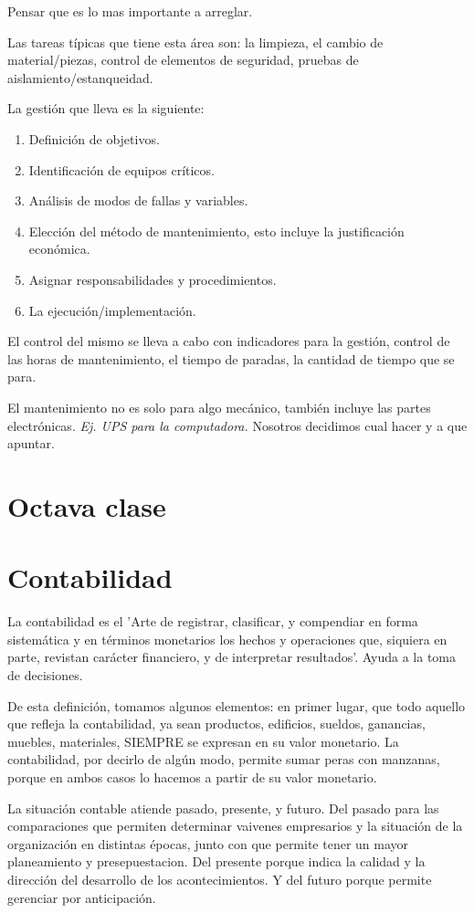 \documentclass[titlepage,a4paper]{article}
\begin{document}
Pensar que es lo mas importante a arreglar.

Las tareas típicas que tiene esta área son: la limpieza, el cambio de material/piezas, control de elementos de seguridad, pruebas de aislamiento/estanqueidad.

La gestión que lleva es la siguiente:
\begin{enumerate}
    \item Definición de objetivos.
    \item Identificación de equipos críticos.
    \item Análisis de modos de fallas y variables.
    \item Elección del método de mantenimiento, esto incluye la justificación económica.
    \item Asignar responsabilidades y procedimientos.
    \item La ejecución/implementación.
\end{enumerate}

El control del mismo se lleva a cabo con indicadores para la gestión, control de las horas de mantenimiento, el tiempo de paradas, la cantidad de tiempo que se para.

El mantenimiento no es solo para algo mecánico, también incluye las partes electrónicas. \textit{Ej. UPS para la computadora.}
Nosotros decidimos cual hacer y a que apuntar.


\section*{Octava clase}
\section{Contabilidad}
La contabilidad es el 'Arte de registrar, clasificar, y compendiar en forma sistemática y en términos monetarios los hechos y operaciones que, siquiera en parte, revistan carácter financiero, y de interpretar resultados'. Ayuda a la toma de decisiones.

De esta definición, tomamos algunos elementos: en primer lugar, que todo aquello que refleja la
contabilidad, ya sean productos, edificios, sueldos, ganancias, muebles, materiales, SIEMPRE se expresan en
su valor monetario. La contabilidad, por decirlo de algún modo, permite sumar peras con manzanas, porque
en ambos casos lo hacemos a partir de su valor monetario. 

La situación contable atiende pasado, presente, y futuro. Del pasado para las comparaciones que permiten determinar vaivenes empresarios y la situación de la organización en distintas épocas, junto con que permite tener un mayor planeamiento y presepuestacion. Del presente porque indica la calidad y la dirección del desarrollo de los acontecimientos. Y del futuro porque permite gerenciar por anticipación.
\end{document}
